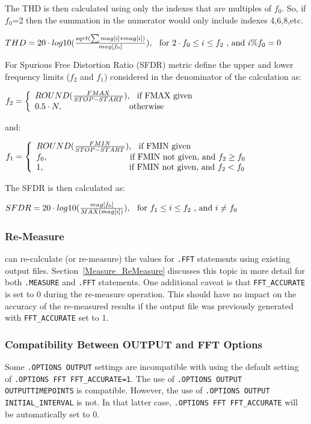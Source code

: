 The THD is then calculated using only the indexes that are multiples of $f_{0}$.  So, if $f_{0}$=2
then the summation in the numerator would only include indexes 4,6,8,etc.

$THD = 20 \cdot log10(\frac{sqrt(\sum mag[i]*mag[i])}{mag[f_{0}]}),\hspace*{0.1in}\textrm{for}~2 \cdot f_{0} \leq i \leq f_{2} ~\textrm{, and}~i\%f_{0}=0$

For Spurious Free Distortion Ratio (SFDR) metric define the upper and lower frequency
limits ($f_{2}$ and $f_{1}$) considered in the denominator of the calculation as:

$f_{2}=\left\{\begin{array}{ll}ROUND(\frac{FMAX}{STOP-START}),\hspace*{0.1in}\textrm{if FMAX given} \\
 0.5 \cdot N,\hspace*{1.1in}\textrm{otherwise}\end{array}\right.$

and:

$f_{1}=\left\{\begin{array}{ll}ROUND(\frac{FMIN}{STOP-START}),\hspace*{0.1in}\textrm{if FMIN given} \\
 f_{0},\hspace*{1.35in}\textrm{if FMIN not given, and}~f_{2} \geq f_{0}\\
 1,\hspace*{1.4in}\textrm{if FMIN not given, and}~f_{2} < f_{0}\end{array}\right.$

The SFDR is then calculated as:

$SFDR = 20 \cdot log10(\frac{mag[f_{0}]}{MAX(mag[i])}), \hspace*{0.1in}\textrm{for}~f_{1} \leq i \leq f_{2}~\textrm{, and}~i \neq f_{0}$

\subsubsection{Re-Measure}
\label{FFT_ReMeasure}
\Xyce{} can re-calculate (or re-measure) the values for {\tt .FFT} statements
using existing \Xyce{} output files.  Section~\ref{Measure_ReMeasure} discusses
this topic in more detail for both {\tt .MEASURE} and {\tt .FFT} statements. One
additional caveat is that \texttt{FFT\_ACCURATE} is set to 0 during the re-measure
operation.  This should have no impact on the accuracy of the re-measured results
if the output file was previously generated with \texttt{FFT\_ACCURATE} set to 1.

\subsubsection{Compatibility Between OUTPUT and FFT Options}
Some \texttt{.OPTIONS OUTPUT} settings are incompatible with using the default
setting of \texttt{.OPTIONS FFT FFT\_ACCURATE=1}.  The use of
\texttt{.OPTIONS OUTPUT OUTPUTTIMEPOINTS} is compatible.  However, the use of
\texttt{.OPTIONS OUTPUT INITIAL\_INTERVAL} is not.  In that latter case,
\texttt{.OPTIONS FFT FFT\_ACCURATE} will be automatically set to 0.

